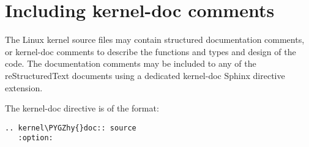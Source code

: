 \documentclass[a4paper,8pt,english]{sphinxmanual}
\def\PYGZhy{\char`\-}
\begin{document}
\chapter{Including kernel-doc comments}
\label{doc-guide/kernel-doc::doc}\label{doc-guide/kernel-doc:including-kernel-doc-comments}
The Linux kernel source files may contain structured documentation comments, or
kernel-doc comments to describe the functions and types and design of the
code. The documentation comments may be included to any of the reStructuredText
documents using a dedicated kernel-doc Sphinx directive extension.

The kernel-doc directive is of the format:

\begin{Verbatim}[commandchars=\\\{\}]
.. kernel\PYGZhy{}doc:: source
   :option:
\end{Verbatim}
\end{document}
